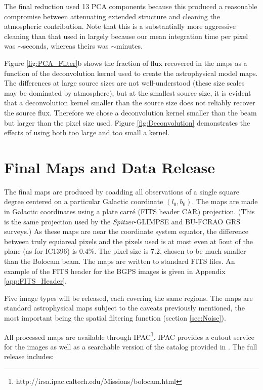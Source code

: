 \documentclass{emulateapj}
\def\spitzer{{\em Spitzer}}
\begin{document}
The final reduction used 13 PCA components because this produced a
reasonable compromise between attenuating extended structure and
cleaning the atmospheric contribution.  Note that this is a
substantially more aggressive cleaning than that used in
\citet{enoch06} largely because our mean integration time per pixel
was $\sim$seconds, whereas theirs was $\sim$minutes.  

Figure \ref{fig:PCA_Filter}b shows the fraction of flux recovered in
the maps as a function of the deconvolution kernel used to create the
astrophysical model maps.  The differences at large source sizes are
not well-understood (these size scales may be dominated by
atmosphere), but at the smallest source size, it is evident that a
deconvolution kernel smaller than the source size does not reliably
recover the source flux.  Therefore we chose a deconvolution kernel
smaller than the beam but larger than the pixel size used.  Figure
\ref{fig:Deconvolution} demonstrates the effects of using both too
large and too small a kernel.

\section{Final Maps and Data Release}
\label{sec:FinalMaps}

The final maps are produced by coadding all observations of a single
square degree centered on a particular Galactic coordinate
$(l_0,b_0)$.  The maps are made in Galactic coordinates using a plate
carr\'{e} (FITS header CAR) projection.  (This is the same projection
used by the \spitzer-GLIMPSE and BU-FCRAO GRS surveys.)  As these maps
are near the coordinate system equator, the difference between truly
equiareal pixels and the pixels used is at most even at 5\arcdeg out
of the plane (as for IC1396) is 0.4\%.  The pixel size is 7.2\arcsec,
chosen to be much smaller than the Bolocam beam.  The maps are written
to standard FITS files.  An example of the FITS header for the BGPS
images is given in Appendix \ref{app:FITS_Header}.

Five image types will be released, each covering the same regions.
The maps are standard astrophysical maps subject to the caveats
previously mentioned, the most important being the spatial filtering
function (section \ref{sec:Noise}).  

All processed maps are available through
IPAC\footnote{http://irsa.ipac.caltech.edu/Missions/bolocam.html}.
IPAC provides a cutout service for the images as well as a searchable
version of the catalog provided in \citet{rosolowsky09}.  The full
release includes:
\end{document}
